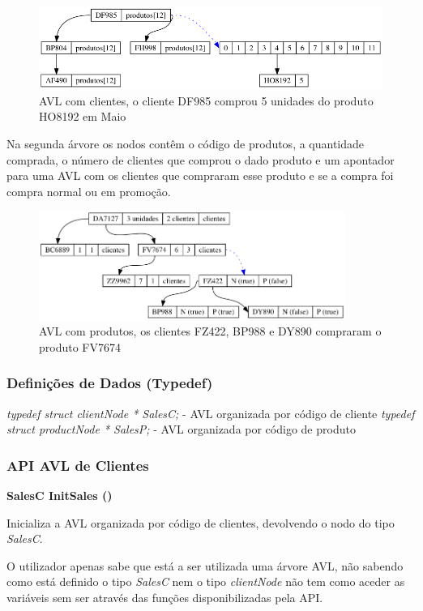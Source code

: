 \documentclass[10pt] {article}
\begin{document}
\begin{figure}[ht!]
\centering
\includegraphics[width=120mm]{avl_salesc.png}
\caption{AVL com clientes, o cliente DF985 comprou 5 unidades do produto HO8192 em Maio}
\end{figure}

\par Na segunda árvore os nodos contêm o código de produtos, a quantidade comprada, o número de clientes que 
 comprou o dado produto e um apontador para uma AVL com os clientes que compraram esse produto e se a 
 compra foi compra normal ou em promoção.

\begin{figure}[ht!]
\centering
\includegraphics[width=100mm]{avl_salesp.png}
\caption{AVL com produtos, os clientes FZ422, BP988 e DY890 compraram o produto FV7674}
\end{figure}
 
 \subsubsection{Definições de Dados (Typedef)}
 \emph{typedef struct clientNode * SalesC;} - AVL organizada por código de cliente
 \emph{typedef struct productNode * SalesP;} - AVL organizada por código de produto
 
 \subsubsection{API AVL de Clientes}
\noindent \textbf {SalesC InitSales ()}
\par Inicializa a AVL organizada por código de clientes, devolvendo o nodo do tipo \emph{SalesC}.
\par O utilizador apenas sabe que está a ser utilizada uma árvore AVL, não sabendo como está definido o tipo 
\emph{SalesC} nem o tipo \emph{clientNode} não tem como aceder as variáveis sem ser através das funções 
disponibilizadas pela API. \\
\end{document}
